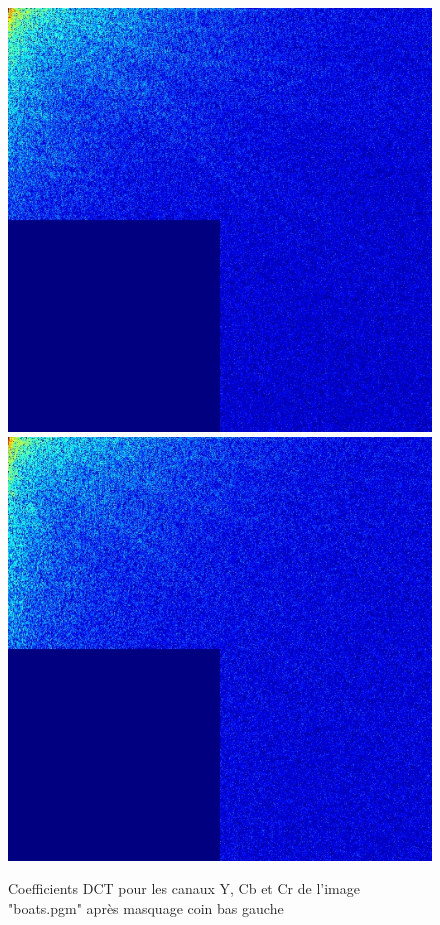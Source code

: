 \documentclass[12pt]{report}
\begin{document}
\begin{figure}[H]
\begin{center}
\includegraphics[scale=0.25]{../ImageRes/dct_masked3_1.jpg} 
\includegraphics[scale=0.25]{../ImageRes/dct_masked3_2.jpg} 
\caption{Coefficients DCT pour les canaux Y, Cb et Cr de l'image "boats.pgm" après masquage coin bas gauche}
\end{center}
\end{figure}
\end{document}
